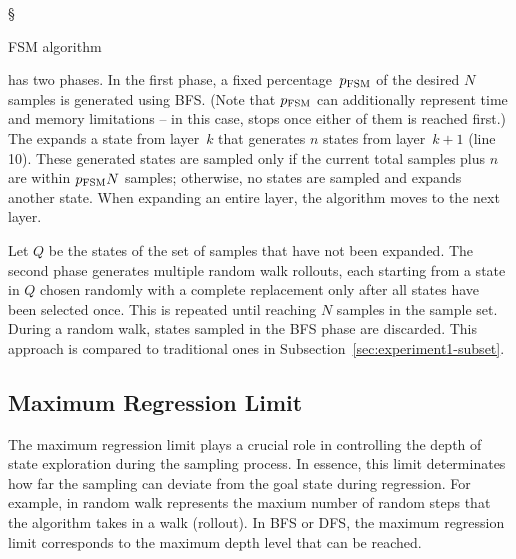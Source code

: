 \begin{algorithm}[h]
{        

        \Return \S \\
    }

    \caption{FSM algorithm}
    \label{alg:fsm}
\end{algorithm}

\bfs has two phases. In the first phase, a fixed percentage~$p_\text{FSM}$ of the desired $N$ samples is generated using BFS. (Note that $p_\text{FSM}$ can additionally represent time and memory limitations -- in this case, \bfs stops once either of them is reached first.) The \bfs expands a state from layer~$k$ that generates $n$ states from layer~$k+1$ (line 10). These generated states are sampled only if the current total samples plus $n$ are within $p_{\text{FSM}}N$ samples; otherwise, no states are sampled and \bfs expands another state. When expanding an entire layer, the algorithm moves to the next layer.

Let $Q$ be the states of the set of samples that have not been expanded. The second phase generates multiple random walk rollouts, each starting from a state in $Q$ chosen randomly with a complete replacement only after all states have been selected once. This is repeated until reaching $N$ samples in the sample set. During a random walk, states sampled in the BFS phase are discarded. This approach is compared to traditional ones in Subsection~\ref{sec:experiment1-subset}.

\subsection{Maximum Regression Limit}
\label{sec:rollout-depth-limit}

The maximum regression limit plays a crucial role in controlling the depth of state exploration during the sampling process. In essence, this limit determinates how far the sampling can deviate from the goal state during regression. For example, in random walk represents the maxium number of random steps that the algorithm takes in a walk (rollout). In BFS or DFS, the maximum regression limit corresponds to the maximum depth level that can be reached.

